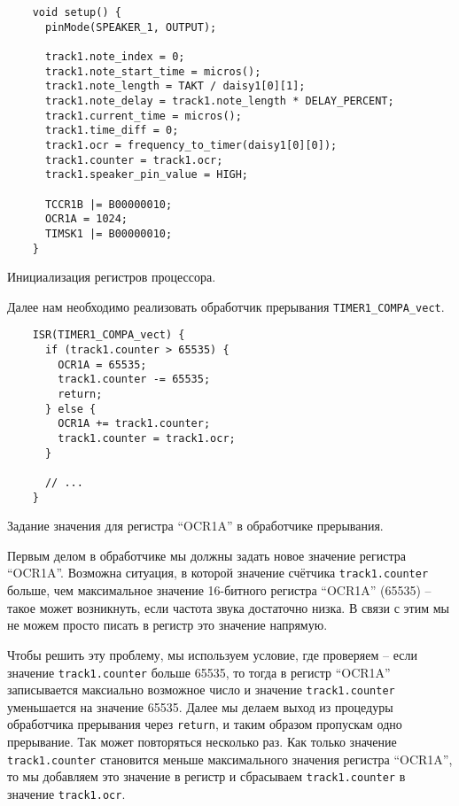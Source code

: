 \documentclass[../sparc.tex]{subfiles}
\begin{document}
\begin{listing}[H]
  \begin{verbatim}
    void setup() {
      pinMode(SPEAKER_1, OUTPUT);

      track1.note_index = 0;
      track1.note_start_time = micros();
      track1.note_length = TAKT / daisy1[0][1];
      track1.note_delay = track1.note_length * DELAY_PERCENT;
      track1.current_time = micros();
      track1.time_diff = 0;
      track1.ocr = frequency_to_timer(daisy1[0][0]);
      track1.counter = track1.ocr;
      track1.speaker_pin_value = HIGH;

      TCCR1B |= B00000010;
      OCR1A = 1024;
      TIMSK1 |= B00000010;
    }
  \end{verbatim}
  \caption{Инициализация регистров процессора.}
  \label{listing:mcu-music-8}
\end{listing}

Далее нам необходимо реализовать обработчик прерывания
\texttt{TIMER1_COMPA_vect}.

\begin{listing}[H]
  \begin{verbatim}
    ISR(TIMER1_COMPA_vect) {
      if (track1.counter > 65535) {
        OCR1A = 65535;
        track1.counter -= 65535;
        return;
      } else {
        OCR1A += track1.counter;
        track1.counter = track1.ocr;
      }

      // ...
    }
  \end{verbatim}
  \caption{Задание значения для регистра ``OCR1A'' в обработчике прерывания.}
  \label{listing:mcu-music-9}
\end{listing}

Первым делом в обработчике мы должны задать новое значение регистра ``OCR1A''.
Возможна ситуация, в которой значение счётчика \texttt{track1.counter}
больше, чем максимальное значение 16-битного регистра ``OCR1A'' (65535) -- такое
может возникнуть, если частота звука достаточно низка.  В связи с этим мы не
можем просто писать в регистр это значение напрямую.

Чтобы решить эту проблему, мы используем условие, где проверяем -- если значение
\texttt{track1.counter} больше 65535, то тогда в регистр ``OCR1A''
записывается максиально возможное число и значение
\texttt{track1.counter} уменьшается на значение 65535.  Далее мы делаем
выход из процедуры обработчика прерывания через \texttt{return}, и
таким образом пропускам одно прерывание.  Так может повторяться несколько раз.
Как только значение \texttt{track1.counter} становится меньше
максимального значения регистра ``OCR1A'', то мы добавляем это значение в
регистр и сбрасываем \texttt{track1.counter} в значение
\texttt{track1.ocr}.
\end{document}

